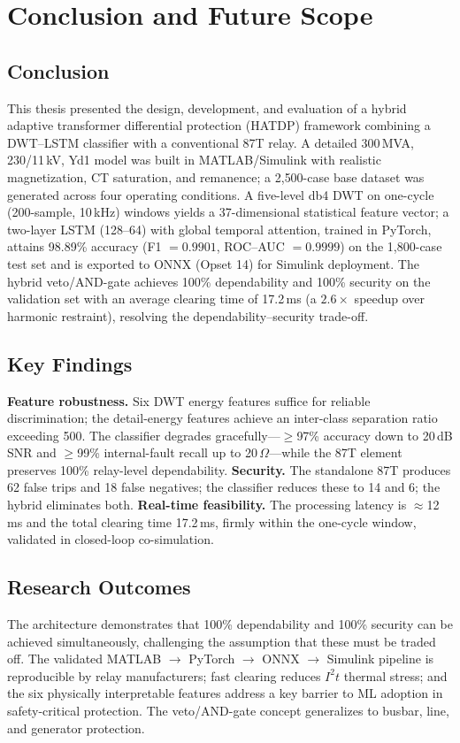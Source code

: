 \documentclass[12pt,a4paper,oneside]{report}
\begin{document}
\chapter{Conclusion and Future Scope}
\section{Conclusion}
This thesis presented the design, development, and evaluation of a hybrid adaptive transformer differential protection (HATDP) framework combining a DWT--LSTM classifier with a conventional 87T relay. A detailed 300\,MVA, 230/11\,kV, Yd1 model was built in MATLAB/Simulink with realistic magnetization, CT saturation, and remanence; a 2{,}500-case base dataset was generated across four operating conditions. A five-level db4 DWT on one-cycle (200-sample, 10\,kHz) windows yields a 37-dimensional statistical feature vector; a two-layer LSTM (128--64) with global temporal attention, trained in PyTorch, attains 98.89\% accuracy (F1 $=0.9901$, ROC--AUC $=0.9999$) on the 1{,}800-case test set and is exported to ONNX (Opset 14) for Simulink deployment. The hybrid veto/AND-gate achieves 100\% dependability and 100\% security on the validation set with an average clearing time of 17.2\,ms (a $2.6\times$ speedup over harmonic restraint), resolving the dependability--security trade-off.

\section{Key Findings}
\textbf{Feature robustness.} Six DWT energy features suffice for reliable discrimination; the detail-energy features achieve an inter-class separation ratio exceeding 500. The classifier degrades gracefully---$\ge$97\% accuracy down to 20\,dB SNR and $\ge$99\% internal-fault recall up to 20\,$\Omega$---while the 87T element preserves 100\% relay-level dependability. \textbf{Security.} The standalone 87T produces 62 false trips and 18 false negatives; the classifier reduces these to 14 and 6; the hybrid eliminates both. \textbf{Real-time feasibility.} The processing latency is $\approx$12\,ms and the total clearing time 17.2\,ms, firmly within the one-cycle window, validated in closed-loop co-simulation.

\section{Research Outcomes}
The architecture demonstrates that 100\% dependability and 100\% security can be achieved simultaneously, challenging the assumption that these must be traded off. The validated MATLAB $\to$ PyTorch $\to$ ONNX $\to$ Simulink pipeline is reproducible by relay manufacturers; fast clearing reduces $I^2t$ thermal stress; and the six physically interpretable features address a key barrier to ML adoption in safety-critical protection. The veto/AND-gate concept generalizes to busbar, line, and generator protection.
\end{document}
